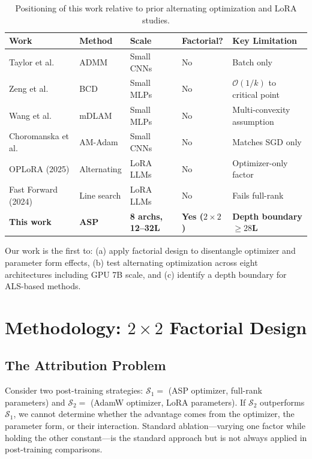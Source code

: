 \documentclass[11pt]{article}
\begin{document}
\begin{table}[t]
\centering
\caption{Positioning of this work relative to prior alternating optimization and LoRA studies.}
\begin{tabular}{@{}lllll@{}}
\toprule
\textbf{Work} & \textbf{Method} & \textbf{Scale} & \textbf{Factorial?} & \textbf{Key Limitation} \\
\midrule
Taylor et al.~\cite{taylor2016training} & ADMM & Small CNNs & No & Batch only \\
Zeng et al.~\cite{zeng2019global} & BCD & Small MLPs & No & $\mathcal{O}(1/k)$ to critical point \\
Wang et al.~\cite{wang2018accelerated} & mDLAM & Small MLPs & No & Multi-convexity assumption \\
Choromanska et al.~\cite{choromanska2019beyond} & AM-Adam & Small CNNs & No & Matches SGD only \\
OPLoRA (2025) & Alternating & LoRA LLMs & No & Optimizer-only factor \\
Fast Forward (2024) & Line search & LoRA LLMs & No & Fails full-rank \\
\textbf{This work} & \textbf{ASP} & \textbf{8 archs, 12--32L} & \textbf{Yes ($2\times2$)} & \textbf{Depth boundary $\geq 28$L} \\
\bottomrule
\end{tabular}
\end{table}

Our work is the first to: (a) apply factorial design to disentangle optimizer and parameter form effects, (b) test alternating optimization across eight architectures including GPU 7B scale, and (c) identify a depth boundary for ALS-based methods.

\section{Methodology: $2\times2$ Factorial Design}

\subsection{The Attribution Problem}

Consider two post-training strategies: $\mathcal{S}_1 = $ (ASP optimizer, full-rank parameters) and $\mathcal{S}_2 = $ (AdamW optimizer, LoRA parameters). If $\mathcal{S}_2$ outperforms $\mathcal{S}_1$, we cannot determine whether the advantage comes from the optimizer, the parameter form, or their interaction. Standard ablation---varying one factor while holding the other constant---is the standard approach but is not always applied in post-training comparisons.
\end{document}
